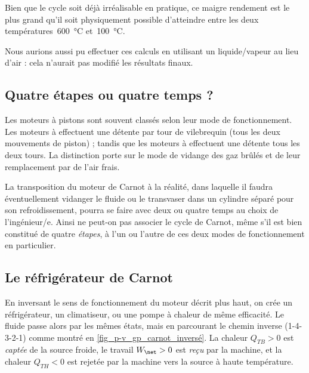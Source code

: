 \begin{anexample}
\begin{answer}
				 		\begin{remark}Bien que le cycle soit déjà irréalisable en pratique, ce maigre rendement est le plus grand qu’il soit physiquement possible d’atteindre entre les deux températures~\SI{600}{\degreeCelsius} et~\SI{100}{\degreeCelsius}.\end{remark}
				 		\begin{remark}Nous aurions aussi pu effectuer ces calculs en utilisant un liquide/vapeur au lieu d’air : cela n’aurait pas modifié les résultats finaux.\end{remark}
				 \end{answer}
		\end{anexample}
		

	\subsection{Quatre étapes ou quatre temps ?}
	
		Les moteurs à pistons sont souvent classés selon leur mode de fonctionnement. Les moteurs à  effectuent une détente par tour de vilebrequin (tous les deux mouvements de piston) ; tandis que les moteurs à  effectuent une détente tous les deux tours. La distinction porte sur le mode de vidange des gaz brûlés et de leur remplacement par de l’air frais.
		
		La transposition du moteur de Carnot à la réalité, dans laquelle il faudra éventuellement vidanger le fluide ou le transvaser dans un cylindre séparé pour son refroidissement, pourra se faire avec deux ou quatre temps au choix de l’ingénieur/e. Ainsi ne peut-on pas associer le cycle de Carnot, même s’il est bien constitué de quatre \emph{étapes}, à l’un ou l’autre de ces deux modes de fonctionnement en particulier.
		

	\subsection{Le réfrigérateur de Carnot}

		En inversant le sens de fonctionnement du moteur décrit plus haut, on crée un réfrigérateur, un climatiseur, ou une pompe à chaleur de même efficacité. Le fluide passe alors par les mêmes états, mais en parcourant le chemin inverse (1-4-3-2-1) comme montré en \cref{fig_p-v_gp_carnot_inversé}. La chaleur $Q_{TB} > 0$ est \emph{captée} de la source froide, le travail $W_\net > 0$ est \emph{reçu} par la machine, et la chaleur $Q_{TH} < 0$ est rejetée par la machine vers la source à haute température.

